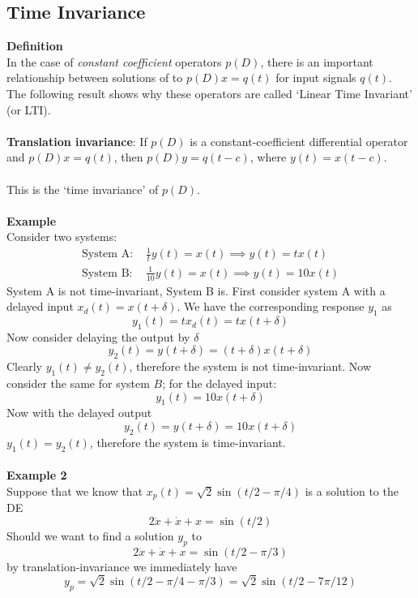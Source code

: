 \documentclass{report}
\begin{document}
\subsection{Time Invariance}
\textbf{Definition}\\
In the case of \textit{constant coefficient} operators $p(D)$, there is an important 
relationship between solutions of to $p(D)x=q(t)$ for input signals $q(t)$. The following result shows why these
operators are called `Linear Time Invariant' (or LTI).\\
\vspace{1mm}\\
\textbf{Translation invariance}: If $p(D)$ is a constant-coefficient differential operator and $p(D)x=q(t)$,
then $p(D)y=q(t-c)$, where $y(t)=x(t-c)$.\\
\vspace{1mm}\\
This is the `time invariance' of $p(D)$.\\
\vspace{1mm}\\
\textbf{Example}\\
Consider two systems:
\begin{align*}
\text{System A: }&\frac{1}{t}y(t)=x(t)\implies y(t)=tx(t)\\
\text{System B: }&\frac{1}{10}y(t)=x(t)\implies y(t)=10x(t)
\end{align*}
System A is not time-invariant, System B is. First consider system A with a delayed input $x_d(t)=x(t+\delta)$.
We have the corresponding response $y_1$ as
\begin{equation*}
y_1(t)=tx_d(t)=tx(t+\delta)
\end{equation*}
Now consider delaying the output by $\delta$
\begin{equation*}
y_2(t)=y(t+\delta)=(t+\delta)x(t+\delta)
\end{equation*}
Clearly $y_1(t)\neq y_2(t)$, therefore the system is not time-invariant. Now consider the same for system $B$;
for the delayed input:
\begin{equation*}
y_1(t)=10x(t+\delta)
\end{equation*}
Now with the delayed output
\begin{equation*}
y_2(t)=y(t+\delta)=10x(t+\delta)
\end{equation*}
$y_1(t)=y_2(t)$, therefore the system is time-invariant.\\
\vspace{1mm}\\
\textbf{Example 2}\\
Suppose that we know that $x_p(t)=\sqrt{2}\sin(t/2-\pi/4)$ is a solution to the DE
\begin{equation*}
2\ddot{x}+\dot{x}+x=\sin(t/2)
\end{equation*}
Should we want to find a solution $y_p$ to 
\begin{equation*}
2\ddot{x}+\dot{x}+x=\sin(t/2-\pi/3)
\end{equation*}
by translation-invariance we immediately have
\begin{equation*}
y_p=\sqrt{2}\sin(t/2-\pi/4-\pi/3)=\sqrt{2}\sin(t/2-7\pi/12)
\end{equation*}
\newpage
\end{document}

